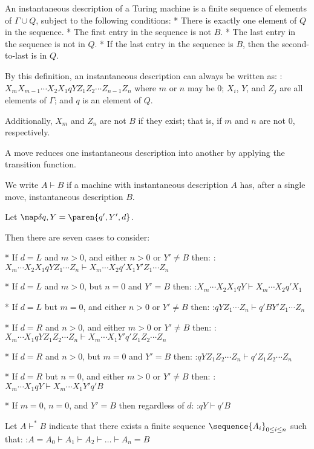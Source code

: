 An instantaneous description of a Turing machine is a finite sequence of elements of $\Gamma \cup Q$, subject to the following conditions:
* There is exactly one element of $Q$ in the sequence.
* The first entry in the sequence is not $B$.
* The last entry in the sequence is not in $Q$.
* If the last entry in the sequence is $B$, then the second-to-last is in $Q$.

By this definition, an instantaneous description can always be written as:
:$X_m X_{m-1} \dotsm X_2 X_1 q Y Z_1 Z_2 \dotsm Z_{n-1} Z_n$
where $m$ or $n$ may be $0$; $X_i$, $Y$, and $Z_j$ are all elements of $\Gamma$; and $q$ is an element of $Q$.

Additionally, $X_m$ and $Z_n$ are not $B$ if they exist; that is, if $m$ and $n$ are not $0$, respectively.


A move reduces one instantaneous description into another by applying the transition function.

We write $A \vdash B$ if a machine with instantaneous description $A$ has, after a single move, instantaneous description $B$.

Let $\map \delta {q, Y} = \paren{q', Y', d}$.

Then there are seven cases to consider:

* If $d = L$ and $m > 0$, and either $n > 0$ or $Y' \neq B$ then:
:$X_m \dotsm X_2 X_1 q Y Z_1 \dotsm Z_n \vdash X_m \dotsm X_2 q' X_1 Y' Z_1 \dotsm Z_n$

* If $d = L$ and $m > 0$, but $n = 0$ and $Y' = B$ then:
:$X_m \dotsm X_2 X_1 q Y \vdash X_m \dotsm X_2 q' X_1$

* If $d = L$ but $m = 0$, and either $n > 0$ or $Y' \neq B$ then:
:$q Y Z_1 \dotsm Z_n \vdash q' B Y' Z_1 \dotsm Z_n$

* If $d = R$ and $n > 0$, and either $m > 0$ or $Y' \neq B$ then:
:$X_m \dotsm X_1 q Y Z_1 Z_2 \dotsm Z_n \vdash X_m \dotsm X_1 Y' q' Z_1 Z_2 \dotsm Z_n$

* If $d = R$ and $n > 0$, but $m = 0$ and $Y' = B$ then:
:$q Y Z_1 Z_2 \dotsm Z_n \vdash q' Z_1 Z_2 \dotsm Z_n$

* If $d = R$ but $n = 0$, and either $m > 0$ or $Y' \neq B$ then:
:$X_m \dotsm X_1 q Y \vdash X_m \dotsm X_1 Y' q' B$

* If $m = 0$, $n = 0$, and $Y' = B$ then regardless of $d$:
:$q Y \vdash q' B$


Let $A \vdash^* B$ indicate that there exists a finite sequence $\sequence {A_i}_{0 \leq i \leq n}$ such that:
:$A = A_0 \vdash A_1 \vdash A_2 \vdash \dotso \vdash A_n = B$


